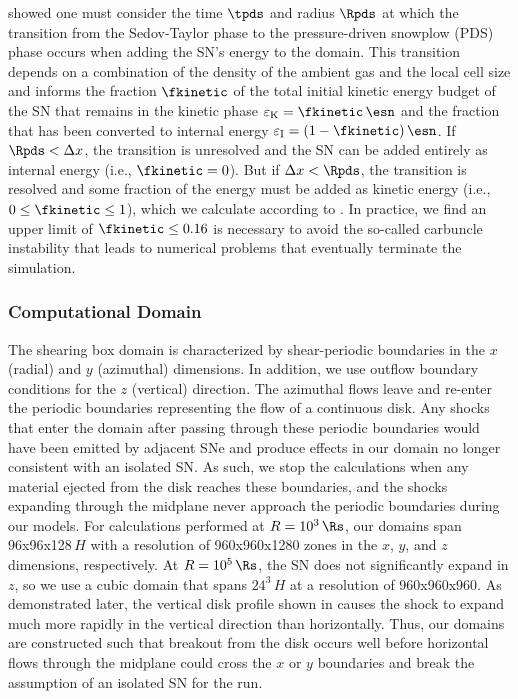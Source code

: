 \citet{Simpson+15} showed one must consider the time $\tpds$ and radius $\Rpds$ at which the transition from the Sedov-Taylor phase to the pressure-driven snowplow (PDS) phase occurs when adding the SN's energy to the domain.
This transition depends on a combination of the density of the ambient gas and the local cell size and informs the fraction $\fkinetic$ of the total initial kinetic energy budget of the SN that remains in the kinetic phase $\varepsilon_{\rm K} = \fkinetic\,\esn$ and the fraction that has been converted to internal energy $\varepsilon_{\rm I} = (1-\fkinetic)\,\esn$.
If $\Rpds < \Delta x$, the transition is unresolved and the SN can be added entirely as internal energy (i.e., $\fkinetic = 0$).
But if $\Delta x < \Rpds$, the transition is resolved and some fraction of the energy must be added as kinetic energy (i.e., $0\leq\fkinetic\leq1$), which we calculate according to \citet{Simpson+15}.
In practice, we find an upper limit of $\fkinetic \leq 0.16$ is necessary to avoid the so-called carbuncle instability \citep{PeeryImlay88, Robinet+00} that leads to numerical problems that eventually terminate the simulation.


\subsubsection{Computational Domain} \label{sec:HydroDomains}

The shearing box domain is characterized by shear-periodic boundaries in the $x$ (radial) and $y$ (azimuthal) dimensions.
In addition, we use outflow boundary conditions for the $z$ (vertical) direction.
The azimuthal flows leave and re-enter the periodic boundaries representing the flow of a continuous disk.
Any shocks that enter the domain after passing through these periodic boundaries would have been emitted by adjacent SNe and produce effects in our domain no longer consistent with an isolated SN.
As such, we stop the calculations when any material ejected from the disk reaches these boundaries, and the shocks expanding through the midplane never approach the periodic boundaries during our models.
For calculations performed at $R=10^3\,\Rs$, our domains span 96x96x128$\,H$ with a resolution of 960x960x1280 zones in the $x$, $y$, and $z$ dimensions, respectively.
At $R=10^5\,\Rs$, the SN does not significantly expand in $z$, so we use a cubic domain that spans $24^3\,H$ at a resolution of 960x960x960.
As demonstrated later, the vertical disk profile shown in  causes the shock to expand much more rapidly in the vertical direction than horizontally.
Thus, our domains are constructed such that breakout from the disk occurs well before horizontal flows through the midplane could cross the $x$ or $y$ boundaries and break the assumption of an isolated SN for the run.


